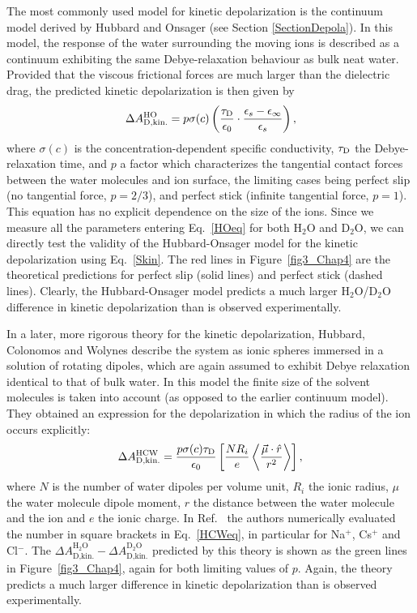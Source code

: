 The most commonly used model for kinetic depolarization is the continuum model derived by Hubbard and Onsager\!\cite{Hubbard1977,Hubbard1979a} (see Section \ref{SectionDepola}). In this model, the response of the water surrounding the moving ions is described as a continuum exhibiting the same Debye-relaxation behaviour as bulk neat water. Provided that the viscous frictional forces are much larger than 
the dielectric drag, the predicted kinetic depolarization is then given by
\begin{eqnarray}
\Delta A_{\text{D,kin.}}^{\rm HO} = p \sigma(c)  \left( \frac{ \tau_{\rm D} }{  \epsilon_0} \cdot \frac{\epsilon_s -\epsilon_{\infty}}{\epsilon_s }   \right),
\label{HOeq}
\end{eqnarray}
where $\sigma(c)$ is the concentration-dependent specific conductivity, $\tau_{\rm D}$ the Debye-relaxation time, and $p$ a factor which characterizes the tangential contact forces between the water molecules and ion surface, the limiting cases being perfect slip (no tangential force, $p = 2/3$), and perfect stick (infinite tangential force, $p=1$). This equation has no explicit dependence on the size of the ions. 
Since we measure all the parameters entering Eq.\ \ref{HOeq} for both H$_2$O and D$_2$O, we can directly test the validity of the Hubbard-Onsager model for the kinetic depolarization using Eq.~\ref{Skin}. The red lines in Figure~\ref{fig3_Chap4} are the theoretical predictions  for perfect slip (solid lines) and perfect stick (dashed lines). Clearly, the Hubbard-Onsager model predicts a much larger H$_2$O/D$_2$O difference in kinetic depolarization than is observed experimentally.

In a later, more rigorous theory for the kinetic depolarization, Hubbard, Colonomos and Wolynes describe the system as ionic spheres immersed in a solution of rotating dipoles, which are again assumed to exhibit Debye relaxation identical to that of bulk water. In this model the finite size of the solvent molecules is taken into account (as opposed to the earlier continuum model). They obtained an expression for the depolarization in which the radius of the ion occurs explicitly:\!\cite{Hubbard1979a} 
\begin{eqnarray}
\Delta A_{\text{D,kin.}}^{\rm HCW} = \frac{p \sigma(c) \tau_{\rm D}}{ \epsilon_0} \left[ \frac{N R_i}{e} \left\langle \frac{ \vec{\mu} \cdot \hat{r}}{r^2} \right\rangle \right], 
\label{HCWeq}
\end{eqnarray}
where $N$ is the number of water dipoles per volume unit, $R_i$ the ionic radius, $\mu$ the water molecule dipole moment, $r$ the distance between the water molecule and the ion and $e$ the ionic charge. In Ref.~ the authors numerically evaluated the number in square brackets in Eq.~\ref{HCWeq}, in particular for Na$^+$, Cs$^+$ and Cl$^-$. 
The $\Delta A_{\text{D,kin.}}^{\text{H}_2\text{O}} - \Delta A_{\text{D,kin.}}^{\text{D}_2\text{O}}$ predicted by this theory is shown as the green lines in Figure~\ref{fig3_Chap4}, again for both limiting values of $p$. Again, the theory predicts a much larger difference in kinetic depolarization than is observed experimentally.


